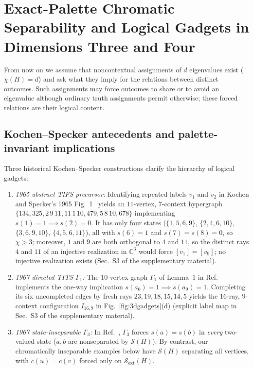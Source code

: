 \documentclass[aps,pra,reprint,superscriptaddress,longbibliography,nofootinbib,floatfix,10pt]{revtex4-2}
\theoremstyle{definition}\newtheorem{definition}[theorem]{Definition}
\theoremstyle{remark}\newtheorem{remark}[theorem]{Remark}
\newcommand{\C}{\mathbb C}\newcommand{\R}{\mathbb R}\newcommand{\Q}{\mathbb Q}
\newcommand{\Sc}{\mathcal S}\newcommand{\Cc}{\mathcal C}
\begin{document}

\section{Exact-Palette Chromatic Separability and Logical Gadgets in Dimensions Three and Four}\label{sec:logical}\label{sec:geometric}

From now on we assume that noncontextual assignments of $d$ eigenvalues exist ($\chi(H)=d$) and ask what they imply for the relations between distinct outcomes. Such assignments may force outcomes to share or to avoid an eigenvalue although ordinary truth assignments permit otherwise; these forced relations are their logical content.

\subsection{Kochen--Specker antecedents and palette-invariant implications}\label{sec:historical}

Three historical Kochen--Specker constructions clarify the hierarchy of logical gadgets:
\begin{enumerate}
\item \emph{1965 abstract TIFS precursor:} Identifying repeated labels $v_1$ and $v_2$ in Kochen and Specker's 1965 Fig.~1~\cite[p.~182]{kochen2} yields an $11$-vertex, $7$-context hypergraph $\{134,325,2\,9\,11,11\,1\,10,479,5\,8\,10,678\}$ implementing $s(1)=1\implies s(2)=0$. It has only four states ($\{1,5,6,9\}$, $\{2,4,6,10\}$, $\{3,6,9,10\}$, $\{4,5,6,11\}$), all with $s(6)=1$ and $s(7)=s(8)=0$, so $\chi>3$; moreover, $1$ and $9$ are both orthogonal to $4$ and $11$, so the distinct rays $4$ and $11$ of an injective realization in $\C^3$ would force $[v_1]=[v_9]$; no injective realization exists (Sec.~S3 of the supplementary material).
\item \emph{1967 directed TITS $\Gamma_1$:} The $10$-vertex graph $\Gamma_1$ of Lemma~1 in Ref.~\cite[pp.~68, 70]{kochen1} implements the one-way implication $s(a_0)=1\implies s(a_9)=1$. Completing its six uncompleted edges by fresh rays $23,19,18,15,14,5$ yields the $16$-ray, $9$-context configuration $I_{16,9}$ in Fig.~\ref{fig:3dgadgets}(d) (explicit label map in Sec.~S3 of the supplementary material).
\item \emph{1967 state-inseparable $\Gamma_3$:} In Ref.~\cite[p.~70]{kochen1}, $\Gamma_3$ forces $s(a)=s(b)$ in \emph{every} two-valued state ($a,b$ are nonseparated by $\Sc(H)$). By contrast, our chromatically inseparable examples below have $\Sc(H)$ separating all vertices, with $c(u)=c(v)$ forced only on $\Sc_{\mathrm{ext}}(H)$.
\end{enumerate}
\end{document}
